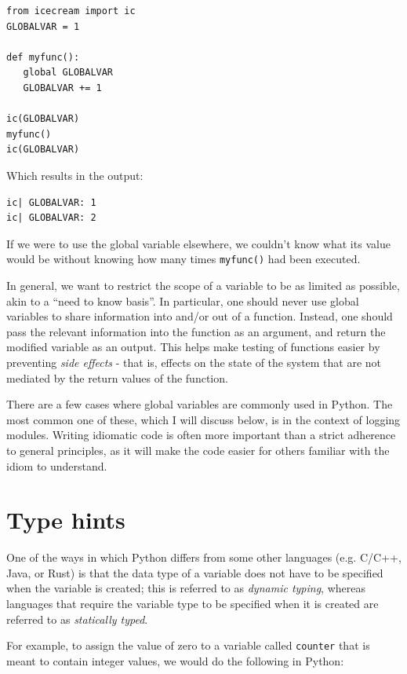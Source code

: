 \begin{lstlisting}[style=Python]
from icecream import ic
GLOBALVAR = 1

def myfunc():
   global GLOBALVAR
   GLOBALVAR += 1

ic(GLOBALVAR)
myfunc()
ic(GLOBALVAR)
\end{lstlisting}

Which results in the output:

\begin{lstlisting}[style=shellshort]
ic| GLOBALVAR: 1
ic| GLOBALVAR: 2
\end{lstlisting}

If we were to use the global variable elsewhere, we couldn't know what its value would be without knowing how many times \texttt{myfunc()} had been executed.

In general, we want to restrict the scope of a variable to be as limited as possible, akin to a ``need to know basis''.
In particular, one should never use global variables to share information into and/or out of a function.
Instead, one should pass the relevant information into the function as an argument, and return the modified variable as an output.
This helps make testing of functions easier by preventing \textit{side effects} - that is, effects on the state of the system that are not mediated by the return values of the function.

There are a few cases where global variables are commonly used in Python.  The most common one of these, which I will discuss below, is in the context of logging modules.  Writing idiomatic code is often more important than a strict adherence to general principles, as it will make the code easier for others familiar with the idiom to understand.


\section{Type hints}

One of the ways in which Python differs from some other languages (e.g. C/C++, Java, or Rust) is that the data type of a variable does not have to be specified when the variable is created; this is referred to as \textit{dynamic typing}, whereas languages that require the variable type to be specified when it is created are referred to as \textit{statically typed}.

For example, to assign the value of zero to a variable called \texttt{counter} that is meant to contain integer values, we would do the following in Python:

